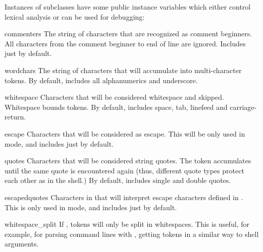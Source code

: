 Instances of  subclasses have some public instance
variables which either control lexical analysis or can be used for
debugging:

\begin{memberdesc}{commenters}
The string of characters that are recognized as comment beginners.
All characters from the comment beginner to end of line are ignored.
Includes just \character{\#} by default.   
\end{memberdesc}

\begin{memberdesc}{wordchars}
The string of characters that will accumulate into multi-character
tokens.  By default, includes all \ASCII{} alphanumerics and
underscore.
\end{memberdesc}

\begin{memberdesc}{whitespace}
Characters that will be considered whitespace and skipped.  Whitespace
bounds tokens.  By default, includes space, tab, linefeed and
carriage-return.
\end{memberdesc}

\begin{memberdesc}{escape}
Characters that will be considered as escape. This will be only used
in \POSIX{} mode, and includes just \character{\textbackslash} by default.
\end{memberdesc}

\begin{memberdesc}{quotes}
Characters that will be considered string quotes.  The token
accumulates until the same quote is encountered again (thus, different
quote types protect each other as in the shell.)  By default, includes
\ASCII{} single and double quotes.
\end{memberdesc}

\begin{memberdesc}{escapedquotes}
Characters in  that will interpret escape characters
defined in .  This is only used in \POSIX{} mode, and
includes just  by default.
\end{memberdesc}

\begin{memberdesc}{whitespace_split}
If , tokens will only be split in whitespaces. This is useful, for
example, for parsing command lines with , getting tokens
in a similar way to shell arguments.
\end{memberdesc}

